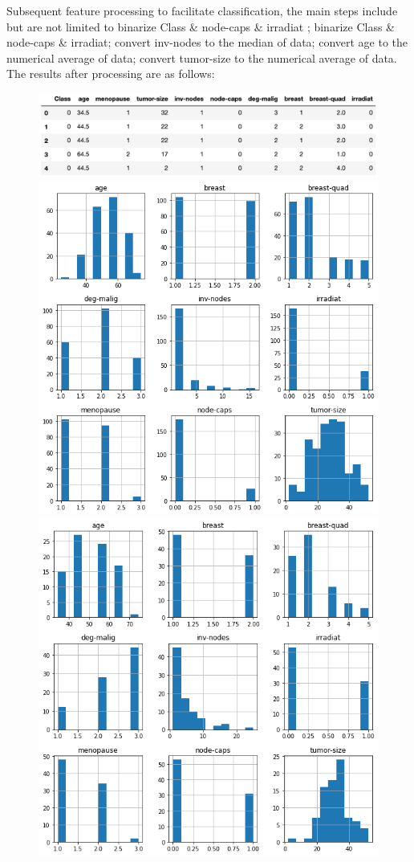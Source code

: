 \documentclass[11pt]{article}
\begin{document}
Subsequent feature processing to facilitate classification, the main steps include but are not limited to binarize Class \& node-caps \& irradiat ; 
binarize Class \& node-caps \& irradiat; convert inv-nodes to the median of data; convert age to the numerical average of data; convert tumor-size to the numerical average of data. 
The results after processing are as follows:
\begin{figure}[H]
    \centering
    \includegraphics[width=1\textwidth]{Fig8}
    \includegraphics[width=1\textwidth]{Fig3}
    \includegraphics[width=1\textwidth]{Fig4}

\end{figure}
\end{document}
